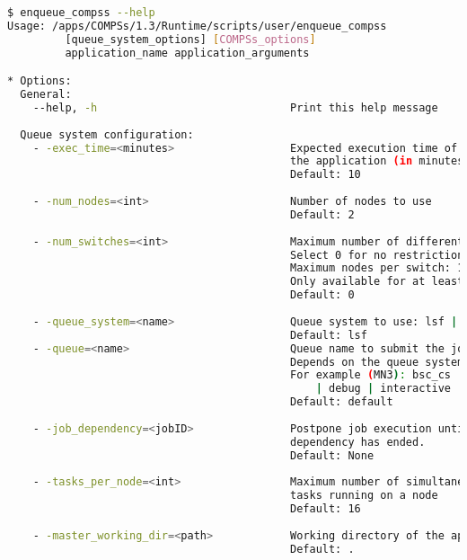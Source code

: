 \begin{lstlisting}[language=bash]
$ enqueue_compss --help
Usage: /apps/COMPSs/1.3/Runtime/scripts/user/enqueue_compss 
         [queue_system_options] [COMPSs_options] 
         application_name application_arguments

* Options:
  General:
    --help, -h                              Print this help message
  
  Queue system configuration:
    - -exec_time=<minutes>                  Expected execution time of 
                                            the application (in minutes)
                                            Default: 10
                                            
    - -num_nodes=<int>                      Number of nodes to use
                                            Default: 2
                                            
    - -num_switches=<int>                   Maximum number of different switches.
                                            Select 0 for no restrictions.
                                            Maximum nodes per switch: 18
                                            Only available for at least 4 nodes. 
                                            Default: 0 
                                            
    - -queue_system=<name>                  Queue system to use: lsf | pbs | slurm
                                            Default: lsf
    - -queue=<name>                         Queue name to submit the job. 
                                            Depends on the queue system.
                                            For example (MN3): bsc_cs | bsc_debug
                                                | debug | interactive
                                            Default: default
                                            
    - -job_dependency=<jobID>               Postpone job execution until the job
                                            dependency has ended.
                                            Default: None
                                            
    - -tasks_per_node=<int>                 Maximum number of simultaneous
                                            tasks running on a node
                                            Default: 16
                                            
    - -master_working_dir=<path>            Working directory of the application
                                            Default: .
                                            

\end{lstlisting}
